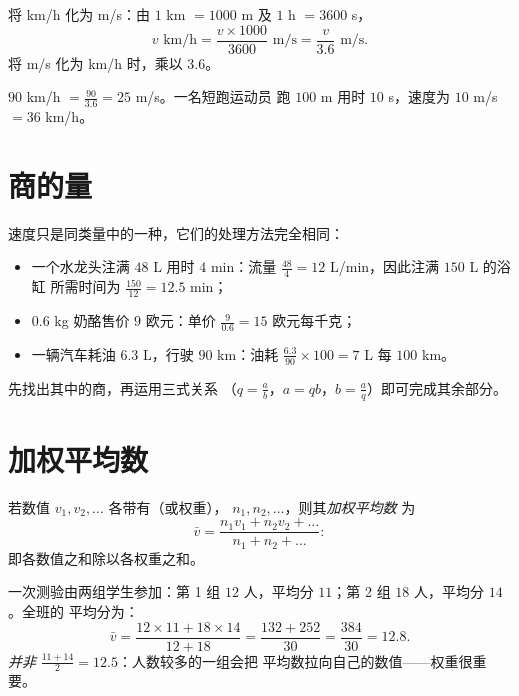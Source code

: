 \begin{method}[速度的换算]\label{met:g8:speed:convert}
将 km/h 化为 m/s：由 $1$ km $= 1000$ m 及 $1$ h $= 3600$ s，
\[
v \text{ km/h} = \frac{v \times 1000}{3600} \text{ m/s}
= \frac{v}{3.6} \text{ m/s}.
\]
将 m/s 化为 km/h 时，乘以 $3.6$。
\end{method}

\begin{example}\label{ex:g8:speed:convert}
$90$ km/h $= \frac{90}{3.6} = 25$ m/s。一名短跑运动员
跑 $100$ m 用时 $10$ s，速度为 $10$ m/s $= 36$ km/h。
\end{example}

\section{商的量}

\begin{example}[流量、密度、每千克价格]\label{ex:g8:speed:quotients}
速度只是同类量中的一种，它们的处理方法完全相同：
\begin{itemize}
  \item 一个水龙头注满 $48$ L 用时 $4$ min：流量
        $\frac{48}{4} = 12$ L/min，因此注满 $150$ L 的浴缸
        所需时间为 $\frac{150}{12} = 12.5$ min；
  \item $0.6$ kg 奶酪售价 $9$ 欧元：单价
        $\frac{9}{0.6} = 15$ 欧元每千克；
  \item 一辆汽车耗油 $6.3$ L，行驶 $90$ km：油耗
        $\frac{6.3}{90} \times 100 = 7$ L 每 $100$ km。
\end{itemize}
先找出其中的商，再运用三式关系
（$q = \frac ab$，$a = qb$，$b = \frac aq$）即可完成其余部分。
\end{example}

\section{加权平均数}

\begin{definition}[加权平均数]\label{def:g8:speed:average}
若数值 $v_1, v_2, \dots$ 各带有（或权重），
$n_1, n_2, \dots$，则其\emph{加权平均数}
为
\[
\bar v = \frac{n_1 v_1 + n_2 v_2 + \dots}{n_1 + n_2 + \dots} :
\]
即各数值之和除以各权重之和。
\end{definition}

\begin{example}\label{ex:g8:speed:average}
一次测验由两组学生参加：第 1 组 $12$ 人，平均分
$11$；第 2 组 $18$ 人，平均分 $14$。全班的
平均分为：
\[
\bar v = \frac{12 \times 11 + 18 \times 14}{12 + 18}
= \frac{132 + 252}{30} = \frac{384}{30} = 12.8 .
\]
\emph{并非} $\frac{11 + 14}{2} = 12.5$：人数较多的一组会把
平均数拉向自己的数值——权重很重要。
\end{example}

